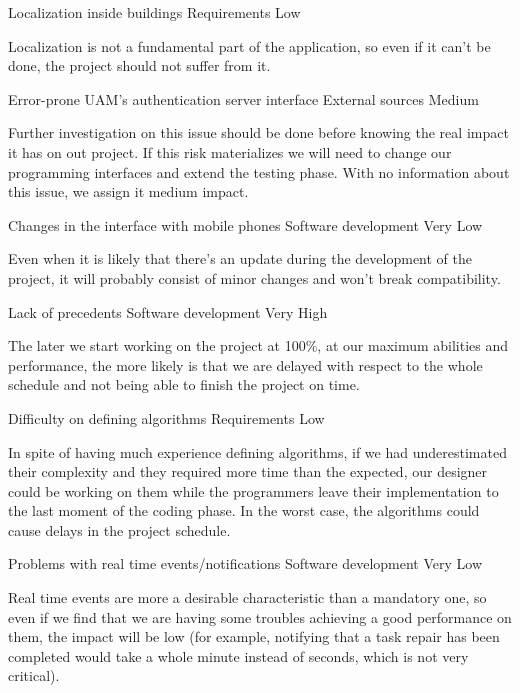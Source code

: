 \begin{risk}[riskLocalization]{Localization inside buildings}
\riskcat Requirements
 Low

Localization is not a fundamental part of the application, so even if it can't be done, the project should not suffer from it.
\end{risk}

\begin{risk}[riskAuthServer]{Error-prone UAM's authentication server interface}
\riskcat External sources
 Medium

Further investigation on this issue should be done before knowing the real impact it has on out project. If this risk materializes we will need to change our programming interfaces and extend the testing phase. With no information about this issue, we assign it medium impact.
\end{risk}

\begin{risk}[riskPhone]{Changes in the interface with mobile phones}
\riskcat Software development
 Very Low

Even when it is likely that there's an update during the development of the project, it will probably consist of minor changes and won't break compatibility.
\end{risk}

\begin{risk}[riskPrec]{Lack of precedents}
\riskcat Software development
 Very High

The later we start working on the project at 100\%, at our maximum abilities and performance, the more likely is that we are delayed with respect to the whole schedule and not being able to finish the project on time.
\end{risk}

\begin{risk}[riskAlgorithms]{Difficulty on defining algorithms}
\riskcat Requirements
 Low

In spite of having much experience defining algorithms, if we had underestimated their complexity and they required more time than the expected, our designer could be working on them while the programmers leave their implementation to the last moment of the coding phase. In the worst case, the algorithms could cause delays in the project schedule.
\end{risk}

\begin{risk}[riskRealTime]{Problems with real time events/notifications}
\riskcat Software development
 Very Low

Real time events are more a desirable characteristic than a mandatory one, so even if we find that we are having some troubles achieving a good performance on them, the impact will be low (for example, notifying that a task repair has been completed would take a whole minute instead of seconds, which is not very critical).
\end{risk}

